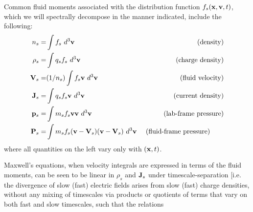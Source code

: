 Common fluid moments associated with the distribution function $f_{s}({\bf x},{\bf v},t)$,
which we will spectrally decompose in the manner indicated, include the following:
\begin{eqnarray}
n_{s} = & \int f_{s}~d^{3}{\bf v} & \mbox{~(density)} \\
\rho_{s} = & \int q_{s} f_{s}~d^{3}{\bf v} & \mbox{~(charge density)} \\
{\bf V}_{s} = & (1/n_{s}) \int f_{s} {\bf v}~d^{3}{\bf v} & \mbox{~(fluid velocity)} \\
{\bf J}_{s} = & \int q_{s} f_{s} {\bf v}~d^{3}{\bf v} & \mbox{~(current density)} \\
{\mathbf p}_{s} = & \int m_{s} f_{s} {\bf v} {\bf v}~d^{3}{\bf v} & 
\mbox{~(lab-frame pressure)} \\
{\mathbf P}_{s} = & \int m_{s} f_{s} ({\bf v} - {\bf V}_{s})({\bf v} - {\bf V}_{s})~d^{3}{\bf v} & 
\mbox{~(fluid-frame pressure) ~~~~~} 
\end{eqnarray}
where all quantities on the left vary only with $({\bf x},t)$. 

Maxwell's equations, when velocity integrals are expressed in terms of the fluid
moments, can be seen to be linear 
in $\rho_{s}$ and ${\bf J}_{s}$ 
under timescale-separation 
[i.e. the divergence of slow (fast) electric fields arises from slow (fast) charge 
densities, without any mixing of timescales via products or quotients of terms that vary on both fast and 
slow timescales, such that the relations

